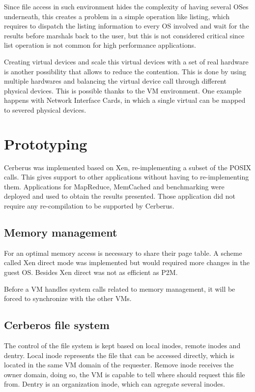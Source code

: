 \documentclass[journal]{IEEEtran}
\begin{document}
\begin{itemize}
	Since file access in such environment hides the complexity of having several OSes underneath, this creates a problem in a simple operation like listing, which requires to dispatch the listing information to every OS involved and wait for the results before marshals back to the user, but this is not considered critical since list operation is not common for high performance applications. %
	
	Creating virtual devices and scale this virtual devices with a set of real hardware is another possibility that allows to reduce the contention. This is done by using multiple hardwares and balancing the virtual device call through different physical devices. This is possible thanks to the VM environment. One example happens with Network Interface Cards, in which a single virtual can be mapped to severed physical devices. 
	
	\section{Prototyping}
	
	Cerberus was implemented based on Xen, re-implementing a subset of the POSIX calls. This gives support to other applications without having to re-implementing them. Applications for MapReduce, MemCached and benchmarking were deployed and used to obtain the results presented. Those application did not require any re-compilation to be supported by Cerberus.
		
	
	\subsection{Memory management}
	
	For an optimal memory access is necessary to share their page table. A scheme called Xen direct mode was implemented but would required more changes in the guest OS. Besides Xen direct was not as efficient as P2M.
	
	Before a VM handles system calls related to memory management, it will be forced to synchronize with the other VMs.
	
	\subsection{Cerberos file system}
	
	The control of the file system is kept based on local inodes, remote inodes and dentry. Local inode represents the file that can be accessed directly, which is located in the same VM domain of the requester. Remove inode receives the owner domain, doing so, the VM is capable to tell where should request this file from. Dentry is an organization inode, which can agregate several inodes.


\end{itemize}
\end{document}
